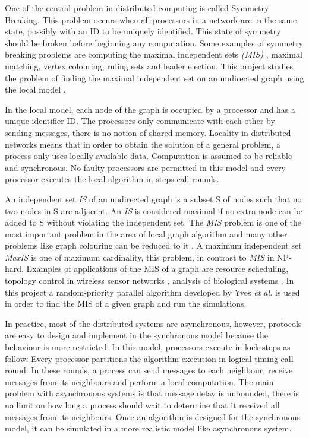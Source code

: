  One of the central problem in distributed computing is called Symmetry Breaking. This problem occurs when all processors in a network are in the same state, possibly with an ID to be uniquely identified. This state of symmetry should be broken before beginning any computation. Some examples of symmetry breaking problems are computing the maximal independent sets \textit{(MIS)} , maximal matching, vertex colouring, ruling sets and leader election. This project studies the problem of finding the maximal independent set on an undirected graph using the local model \cite{linial1992locality}.

In the local model, each node of the graph is occupied by a processor and has a unique identifier ID. The processors only communicate with each other by sending messages, there is no notion of shared memory. Locality in distributed networks means that in order to obtain the solution of a general problem, a process only uses locally available data. Computation is assumed to be reliable and synchronous. No faulty processors are permitted in this model and every processor executes the local algorithm in steps call rounds.

An independent set \textit{IS} of an undirected graph is a subset S of nodes such that no two nodes in S are adjacent. An \textit{IS} is considered maximal if no extra node can be added to S without violating the independent set. The \textit{MIS} problem is one of the most important problem in the area of local graph algorithm and many other problems like graph colouring can be reduced to it \cite{panconesi1992improved}. A maximum independent set \textit{MaxIS} is one of maximum cardinality, this problem, in contrast to \textit{MIS} in NP-hard. Examples of applications of the MIS of a graph are resource scheduling, topology control in wireless sensor networks \cite{basagni2001finding}, analysis of biological systems \cite{afek2013beeping}. In this project a random-priority parallel algorithm developed by Yves \textit{et al.} \cite{yves2009optimal} is used in order to find the MIS of a given graph and run the simulations.


In practice, most of the distributed systems are asynchronous, however, protocols are easy to design and implement in the synchronous model because the behaviour is more restricted. In this model, processors execute in lock steps as follow: Every processor partitions the algorithm execution in logical timing call round. In these rounds, a process can send messages to each neighbour, receive messages from its neighbours and perform a local computation. The main problem with asynchronous systems is that message delay is unbounded, there is no limit on how long a process should wait to determine that it received all messages from its neighbours. Once an algorithm is designed for the synchronous model, it can be simulated in a more realistic model like asynchronous system. 



